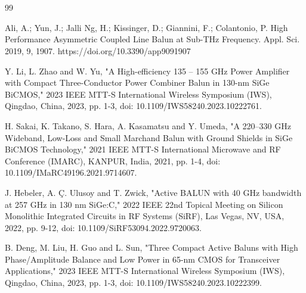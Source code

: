 \section*{}


\begin{thebibliography}{99}

Ali, A.; Yun, J.; Jalli Ng, H.; Kissinger, D.; Giannini, F.; Colantonio, P. High Performance Asymmetric Coupled Line Balun at Sub-THz Frequency. Appl. Sci. 2019, 9, 1907. https://doi.org/10.3390/app9091907

Y. Li, L. Zhao and W. Yu, "A High-efficiency 135 – 155 GHz Power Amplifier with Compact Three-Conductor Power Combiner Balun in 130-nm SiGe BiCMOS," 2023 IEEE MTT-S International Wireless Symposium (IWS), Qingdao, China, 2023, pp. 1-3, doi: 10.1109/IWS58240.2023.10222761.

H. Sakai, K. Takano, S. Hara, A. Kasamatsu and Y. Umeda, "A 220–330 GHz Wideband, Low-Loss and Small Marchand Balun with Ground Shields in SiGe BiCMOS Technology," 2021 IEEE MTT-S International Microwave and RF Conference (IMARC), KANPUR, India, 2021, pp. 1-4, doi: 10.1109/IMaRC49196.2021.9714607.

J. Hebeler, A. Ç. Ulusoy and T. Zwick, "Active BALUN with 40 GHz bandwidth at 257 GHz in 130 nm SiGe:C," 2022 IEEE 22nd Topical Meeting on Silicon Monolithic Integrated Circuits in RF Systems (SiRF), Las Vegas, NV, USA, 2022, pp. 9-12, doi: 10.1109/SiRF53094.2022.9720063.


B. Deng, M. Liu, H. Guo and L. Sun, "Three Compact Active Baluns with High Phase/Amplitude Balance and Low Power in 65-nm CMOS for Transceiver Applications," 2023 IEEE MTT-S International Wireless Symposium (IWS), Qingdao, China, 2023, pp. 1-3, doi: 10.1109/IWS58240.2023.10222399.


\end{thebibliography}
